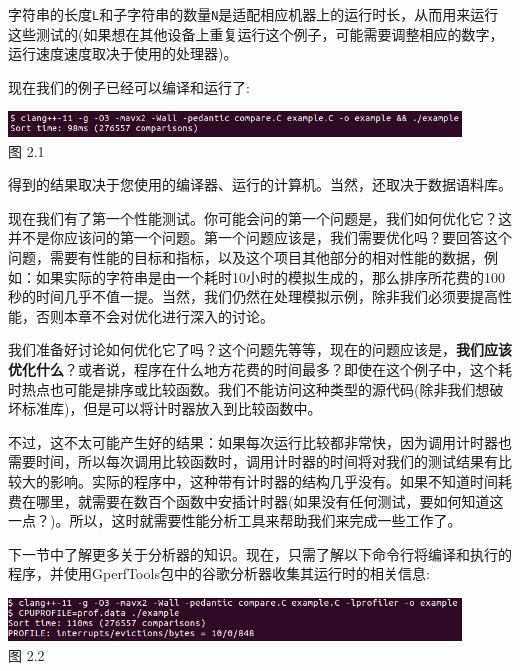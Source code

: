 字符串的长度\texttt{L}和子字符串的数量\texttt{N}是适配相应机器上的运行时长，从而用来运行这些测试的(如果想在其他设备上重复运行这个例子，可能需要调整相应的数字，运行速度速度取决于使用的处理器)。

现在我们的例子已经可以编译和运行了:

\begin{center}
\includegraphics[width=0.9\textwidth]{content/1/chapter2/images/1.jpg}\\
图 2.1
\end{center}

得到的结果取决于您使用的编译器、运行的计算机。当然，还取决于数据语料库。

现在我们有了第一个性能测试。你可能会问的第一个问题是，我们如何优化它？这并不是你应该问的第一个问题。第一个问题应该是，我们需要优化吗？要回答这个问题，需要有性能的目标和指标，以及这个项目其他部分的相对性能的数据，例如：如果实际的字符串是由一个耗时10小时的模拟生成的，那么排序所花费的100秒的时间几乎不值一提。当然，我们仍然在处理模拟示例，除非我们必须要提高性能，否则本章不会对优化进行深入的讨论。

我们准备好讨论如何优化它了吗？这个问题先等等，现在的问题应该是，\textbf{我们应该优化什么}？或者说，程序在什么地方花费的时间最多？即使在这个例子中，这个耗时热点也可能是排序或比较函数。我们不能访问这种类型的源代码(除非我们想破坏标准库)，但是可以将计时器放入到比较函数中。

不过，这不太可能产生好的结果：如果每次运行比较都非常快，因为调用计时器也需要时间，所以每次调用比较函数时，调用计时器的时间将对我们的测试结果有比较大的影响。实际的程序中，这种带有计时器的结构几乎没有。如果不知道时间耗费在哪里，就需要在数百个函数中安插计时器(如果没有任何测试，要如何知道这一点？)。所以，这时就需要性能分析工具来帮助我们来完成一些工作了。

下一节中了解更多关于分析器的知识。现在，只需了解以下命令行将编译和执行的程序，并使用GperfTools包中的谷歌分析器收集其运行时的相关信息:

\begin{center}
\includegraphics[width=0.9\textwidth]{content/1/chapter2/images/2.jpg}\\
图 2.2
\end{center}

